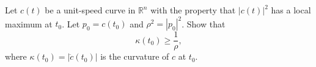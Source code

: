 Let $c(t)$ be a unit-speed curve in $\mathbb{R}^n$ with the property that $|c(t)|^2$ has a local maximum at $t_0$. Let $p_0 = c(t_0)$ and $\rho^2 = |p_0|^2$. Show that
$$\kappa(t_0) \geq \frac{1}{\rho},$$
where $\kappa(t_0) = |\ddot{c}(t_0)|$ is the curvature of $c$ at $t_0$.
